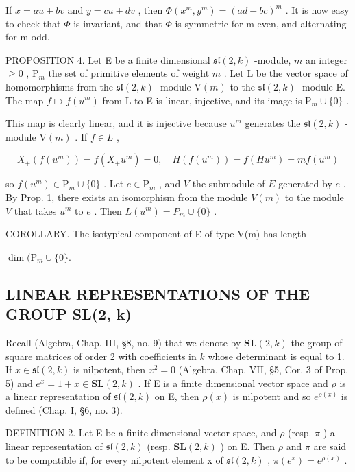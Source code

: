 If \(x = au + bv\) and \(y = cu + dv\) , then \(\Phi(x^{m}, y^{m}) = (ad - bc)^{m}\) . It is now easy to check that \(\Phi\) is invariant, and that \(\Phi\) is symmetric for m even, and alternating for m odd.

PROPOSITION 4. Let E be a finite dimensional \(\mathfrak{sl}(2,k)\) -module, \(m\) an integer \(\geq 0\) , \(\mathrm{P}_m\) the set of primitive elements of weight \(m\) . Let L be the vector space of homomorphisms from the \(\mathfrak{sl}(2,k)\) -module \(\mathrm{V}(m)\) to the \(\mathfrak{sl}(2,k)\) -module E. The map \(f \mapsto f(u^m)\) from L to E is linear, injective, and its image is \(\mathrm{P}_m \cup \{0\}\) .

This map is clearly linear, and it is injective because \(u^{m}\) generates the \(\mathfrak{sl}(2,k)\) -module \(\mathrm{V}(m)\) . If \(f \in L\) ,

\[
X _ {+} (f (u ^ {m})) = f (X _ {+} u ^ {m}) = 0, \quad H (f (u ^ {m})) = f (H u ^ {m}) = m f (u ^ {m})
\]

so \(f(u^{m}) \in \mathrm{P}_{m} \cup \{0\}\) . Let \(e \in \mathrm{P}_{m}\) , and \(V\) the submodule of \(E\) generated by \(e\) . By Prop. 1, there exists an isomorphism from the module \(V(m)\) to the module \(V\) that takes \(u^{m}\) to \(e\) . Then \(L(u^{m}) = P_{m} \cup \{0\}\) .

COROLLARY. The isotypical component of E of type V(m) has length

\(\dim (\mathrm{P}_m\cup \{0\} .\)

\subsection{LINEAR REPRESENTATIONS OF THE GROUP SL(2, k)}

Recall (Algebra, Chap. III, §8, no. 9) that we denote by \(\mathbf{SL}(2,k)\) the group of square matrices of order 2 with coefficients in \(k\) whose determinant is equal to 1. If \(x\in \mathfrak{sl}(2,k)\) is nilpotent, then \(x^{2} = 0\) (Algebra, Chap. VII, §5, Cor. 3 of Prop. 5) and \(e^x = 1 + x\in \mathbf{SL}(2,k)\) . If E is a finite dimensional vector space and \(\rho\) is a linear representation of \(\mathfrak{sl}(2,k)\) on E, then \(\rho (x)\) is nilpotent and so \(e^{\rho (x)}\) is defined (Chap. I, §6, no. 3).

DEFINITION 2. Let E be a finite dimensional vector space, and \(\rho\) (resp. \(\pi\) ) a linear representation of \(\mathfrak{sl}(2,k)\) (resp. \(\mathbf{SL}(2,k)\) ) on E. Then \(\rho\) and \(\pi\) are said to be compatible if, for every nilpotent element x of \(\mathfrak{sl}(2,k)\) , \(\pi(e^{x}) = e^{\rho(x)}\) .

